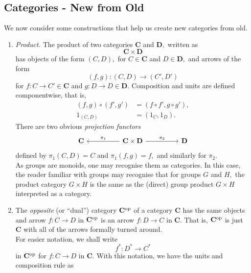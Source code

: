 \subsection{Categories - New from Old}
We now consider some constructions that help us create new categories from old.
\begin{enumerate}
	\item \emph{Product.} The product of two categories $\mathbf{C}$ and $\mathbf{D},$ written as
	\begin{equation*} 
		\mathbf{C} \times \mathbf{D}
	\end{equation*}
	has objects of the form $(C, D),$ for $C \in \mathbf{C}$ and $D \in \mathbf{D},$ and arrows of the form
	\begin{equation*} 
		(f, g) : (C, D) \to (C', D')
	\end{equation*}
	for $f: C \to C' \in \mathbf{C}$ and $g:D\to D\in \mathbf{D}.$ Composition and units are defined componentwise, that is,
	\begin{align*} 
		(f, g) \circ (f', g') &= (f\circ f', g\circ g'),\\
		1_{(C, D)} &= (1_C, 1_D).
	\end{align*}
	There are two obvious \emph{projection functors}
	\begin{equation*} 
		\begin{tikzcd}
			\mathbf{C} && \mathbf{C}\times\mathbf{D} \arrow[rr, "\pi_2"] \arrow[ll, "\pi_1"'] && \mathbf{D}
		\end{tikzcd}
	\end{equation*}
	defined by $\pi_1(C, D) = C$ and $\pi_1(f, g) = f,$ and similarly for $\pi_2.$\\
	As groups are monoids, one may recognise them as categories. In this case, the reader familiar with groups may recognise that for groups $G$ and $H,$ the product category $G\times H$ is the same as the (direct) group product $G \times H$ interpreted as a category.
	\item The \emph{opposite} (or ``dual'') category $\mathbf{C}^{\operatorname{op}}$ of a category $\mathbf{C}$ has the same objects and arrow $f:C\to D$ in $\mathbf{C}^{\operatorname{op}}$ is an arrow $f:D\to C$ in $\mathbf{C}.$ That is, $\mathbf{C}^{\operatorname{op}}$ is just $\mathbf{C}$ with all of the arrows formally turned around.\\
	For easier notation, we shall write
	\begin{equation*} 
		f^* : D^* \to C^*
	\end{equation*}
	in $\mathbf{C}^{\operatorname{op}}$ for $f:C\to D$ in $\mathbf{C}.$ With this notation, we have the units and composition rule as

\end{enumerate}
